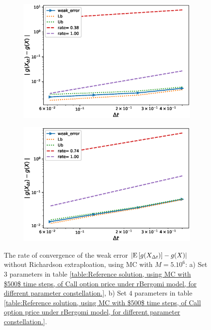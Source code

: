 \FloatBarrier


\begin{figure}[!htb]
	\centering
	\begin{subfigure}{.35\textwidth}
		\centering
		\includegraphics[width=1\linewidth]{./figures/rBergomi_weak_error_rates/without_richardson/H_002/weak_convergence_order_Bergomi_H_002_K_08_M_5_10_6_CI_relative}
		\caption{}
		\label{fig:sub3}
	\end{subfigure}%
	\begin{subfigure}{.35\textwidth}
		\centering
		\includegraphics[width=1\linewidth]{./figures/rBergomi_weak_error_rates/without_richardson/H_002/weak_convergence_order_Bergomi_H_002_K_12_M_3_10_6_CI_relative}
		\caption{}
		\label{fig:sub4}
	\end{subfigure}
	
	\caption{The rate of convergence of the weak error $\left\lvert\mathrm{E}\left[g(X_{\Delta t})\right]-g(X)\right\rvert$  without Richardson extraploation, using MC with $M=5.10^6$: a) Set $3$ parameters in table \ref{table:Reference solution, using MC with $500$ time steps, of Call option price under rBergomi model, for different parameter constellation.},  b) Set $4$ parameters in table \ref{table:Reference solution, using MC with $500$ time steps, of Call option price under rBergomi model, for different parameter constellation.}. }
	\label{fig:Weak_rate_H_002_without_rich_K_1_K_08}
\end{figure}

